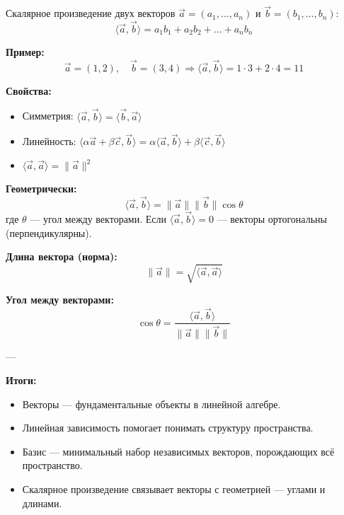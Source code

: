 Скалярное произведение двух векторов $\vec{a} = (a_1, \dots, a_n)$ и $\vec{b} = (b_1, \dots, b_n)$:
\[
\langle \vec{a}, \vec{b} \rangle = a_1 b_1 + a_2 b_2 + \dots + a_n b_n
\]

\textbf{Пример:}
\[
\vec{a} = (1, 2), \quad \vec{b} = (3, 4) \Rightarrow \langle \vec{a}, \vec{b} \rangle = 1\cdot3 + 2\cdot4 = 11
\]

\textbf{Свойства:}
\begin{itemize}
  \item Симметрия: $\langle \vec{a}, \vec{b} \rangle = \langle \vec{b}, \vec{a} \rangle$
  \item Линейность: $\langle \alpha \vec{a} + \beta \vec{c}, \vec{b} \rangle = \alpha \langle \vec{a}, \vec{b} \rangle + \beta \langle \vec{c}, \vec{b} \rangle$
  \item $\langle \vec{a}, \vec{a} \rangle = \|\vec{a}\|^2$
\end{itemize}

\textbf{Геометрически:}
\[
\langle \vec{a}, \vec{b} \rangle = \|\vec{a}\|\|\vec{b}\|\cos\theta
\]
где $\theta$ — угол между векторами.  
Если $\langle \vec{a}, \vec{b} \rangle = 0$ — векторы ортогональны (перпендикулярны).

\begin{center}
\end{center}

\vspace{2em}
\textbf{Длина вектора (норма):}
\[
\|\vec{a}\| = \sqrt{\langle \vec{a}, \vec{a} \rangle}
\]

\textbf{Угол между векторами:}
\[
\cos\theta = \frac{\langle \vec{a}, \vec{b} \rangle}{\|\vec{a}\|\|\vec{b}\|}
\]

---

\textbf{Итоги:}
\begin{itemize}
  \item Векторы — фундаментальные объекты в линейной алгебре.
  \item Линейная зависимость помогает понимать структуру пространства.
  \item Базис — минимальный набор независимых векторов, порождающих всё пространство.
  \item Скалярное произведение связывает векторы с геометрией — углами и длинами.
\end{itemize}
